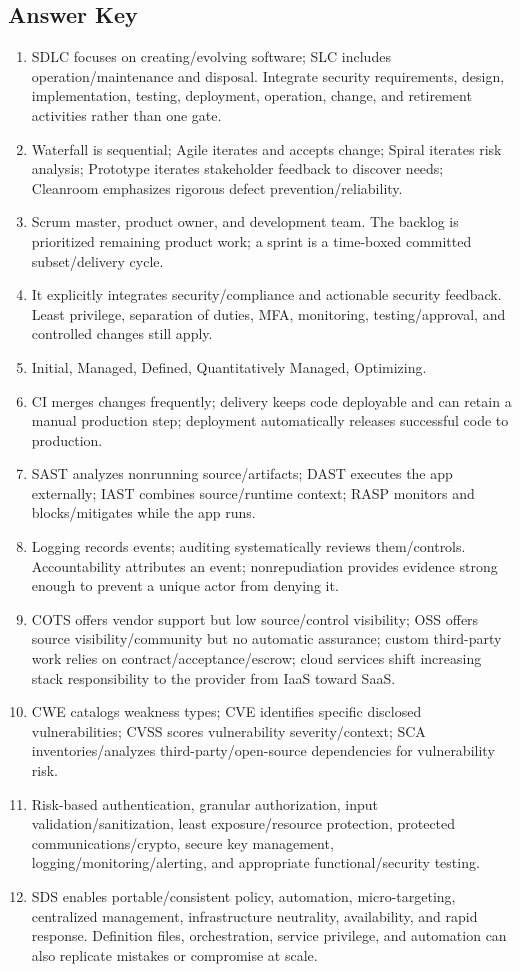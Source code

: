 \documentclass[10pt,letterpaper]{article}
\begin{document}
\subsection*{\color{teal}Answer Key}
{\small
\begin{enumerate}[nosep]
\item SDLC focuses on creating/evolving software; SLC includes operation/maintenance and disposal. Integrate security requirements, design, implementation, testing, deployment, operation, change, and retirement activities rather than one gate.
\item Waterfall is sequential; Agile iterates and accepts change; Spiral iterates risk analysis; Prototype iterates stakeholder feedback to discover needs; Cleanroom emphasizes rigorous defect prevention/reliability.
\item Scrum master, product owner, and development team. The backlog is prioritized remaining product work; a sprint is a time-boxed committed subset/delivery cycle.
\item It explicitly integrates security/compliance and actionable security feedback. Least privilege, separation of duties, MFA, monitoring, testing/approval, and controlled changes still apply.
\item Initial, Managed, Defined, Quantitatively Managed, Optimizing.
\item CI merges changes frequently; delivery keeps code deployable and can retain a manual production step; deployment automatically releases successful code to production.
\item SAST analyzes nonrunning source/artifacts; DAST executes the app externally; IAST combines source/runtime context; RASP monitors and blocks/mitigates while the app runs.
\item Logging records events; auditing systematically reviews them/controls. Accountability attributes an event; nonrepudiation provides evidence strong enough to prevent a unique actor from denying it.
\item COTS offers vendor support but low source/control visibility; OSS offers source visibility/community but no automatic assurance; custom third-party work relies on contract/acceptance/escrow; cloud services shift increasing stack responsibility to the provider from IaaS toward SaaS.
\item CWE catalogs weakness types; CVE identifies specific disclosed vulnerabilities; CVSS scores vulnerability severity/context; SCA inventories/analyzes third-party/open-source dependencies for vulnerability risk.
\item Risk-based authentication, granular authorization, input validation/sanitization, least exposure/resource protection, protected communications/crypto, secure key management, logging/monitoring/alerting, and appropriate functional/security testing.
\item SDS enables portable/consistent policy, automation, micro-targeting, centralized management, infrastructure neutrality, availability, and rapid response. Definition files, orchestration, service privilege, and automation can also replicate mistakes or compromise at scale.
\end{enumerate}
}
\end{document}
